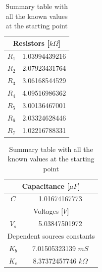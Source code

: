 \begin{table}[H]
    \begin{minipage}{.5\textwidth}
      \centering
      \begin{tabular}{c|c}
        \hline
        \multicolumn{2}{c}{Resistors [$k\Omega$]}  \\
        \hline
        $R_1$ & 1.03994439216 \\
        $R_2$ & 2.07923431764 \\
        $R_3$ & 3.06168544529 \\
        $R_4$ & 4.09516986362 \\
        $R_5$ & 3.00136467001 \\
        $R_6$ & 2.03324628446 \\
        $R_7$ & 1.02216788331
      \end{tabular}
    \end{minipage}
    \begin{minipage}{.5\textwidth}
      \centering
      \begin{tabular}{c|c}
        \hline
        \multicolumn{2}{c}{Capacitance [$\mu F$]}  \\
        \hline
        $C$ & 1.01674167773 \\
        \hline
        \hline
        \multicolumn{2}{c}{Voltages [$V$]}  \\
        \hline
        $V_s$ & 5.03847501972 \\
        \hline
        \hline
        \multicolumn{2}{c}{Dependent sources constants}  \\
        \hline
        $K_b$ & 7.01505323139 $mS$ \\
        $K_c$ & 8.37372457746 $k\Omega$
      \end{tabular}
    \end{minipage}
    \caption{Summary table with all the known values at the starting point}
    \label{tab:initial_values}
\end{table}
